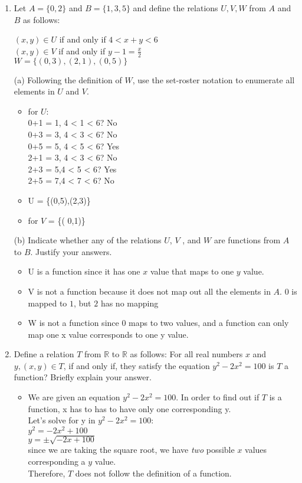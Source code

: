 \documentclass[english,12pt,legalpaper]{article}
\begin{document}
\begin{enumerate}
	\item Let $A = \{0,2\}$ and $B = \{1,3,5\}$ and define the relations $U,V,W$ from $A$ and $B$ as follows:
	\begin{center}
		$(x,y) \in U$ if and only if $4 < x+y < 6$ \\ 
		$(x,y) \in V$ if and only if $y - 1 = \frac{x}{2}$ \\ 
		$W = \{(0,3), (2,1), (0,5)\}$
	\end{center}
	(a) Following the definition of $W$, use the set-roster notation to enumerate all elements in $U$ and $V$. 
	\begin{itemize}
		\item for $U$:
		\\ 0+1 = 1, 4 < 1 < 6? No
		\\ 0+3 = 3, 4 < 3 < 6? No
		\\ 0+5 = 5, 4 < 5 < 6? Yes
		\\ 2+1 = 3, 4 < 3 < 6? No
		\\ 2+3 = 5,4 < 5 < 6? Yes
		\\ 2+5 = 7,4 < 7 < 6? No
		\item U = \{(0,5),(2,3)\}
		\item for $V$ = \{( 0,1)\}
	\end{itemize}
	(b) Indicate whether any of the relations $U$, $V$ , and $W$ are functions from $A$ to $B$. Justify your answers.
	\begin{itemize}
		\item U is a function since it has one $x$ value that maps to one $y$ value.
		\item V is not a function because it does not map out all the elements in $A$. 0 is mapped to $1$, but $2$ has no mapping
		\item W is not a function since 0 maps to two values, and a function can only map one x value corresponds to one y value.
	\end{itemize}
	

	
	\item Define a relation $T$ from $\mathbb{R}$ to $\mathbb{R}$ as follows: For all real numbers $x$ and $y, (x,y) \in T$, if and only if, they satisfy the equation $y^2 - 2x^2 =100$ is $T$ a function? Briefly explain your answer.
	\begin{itemize}
	\item We are given an equation $y^2 - 2x^2 =100$. In order to find out if $T$ is a function, x has to has to have only one corresponding y.
	\\ Let's solve for y in $y^2 - 2x^2 =100$: \\ 
	 $y^2 = -2x^2 + 100$ \\ 
	 $y = \pm \sqrt{-2x+100}$ \\ 
	 since we are taking the square root, we have \textit{two} possible $ x$ values corresponding a $y$ value.
	 \\ Therefore, $T$ does not follow the definition of  a function.
	\end{itemize}
\end{enumerate}
\end{document}
